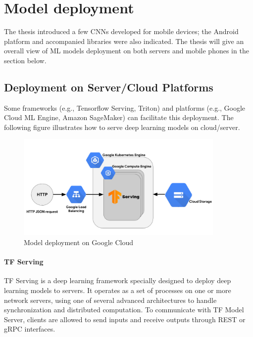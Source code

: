 
\section{Model deployment}
The thesis introduced a few CNNs developed for mobile devices; the Android platform and accompanied libraries were also indicated. The thesis will give an overall view of ML models deployment on both servers and mobile phones in the section below. 

\subsection{Deployment on Server/Cloud Platforms}
Some frameworks (e.g., Tensorflow Serving, Triton) and platforms (e.g., Google Cloud ML Engine, Amazon SageMaker) can facilitate this deployment. The following figure illustrates how to serve deep learning models on cloud/server.

\begin{figure} [H]
    \centering
    \includegraphics[width=0.9\textwidth]{chapter2/image/tfserving.png}
    \caption{Model deployment on Google Cloud}
    \label{fig:cloud}
\end{figure}

\paragraph{TF Serving}
TF Serving \cite{tfserving} is a deep learning framework specially designed to deploy deep learning models to servers. It operates as a set of processes on one or more network servers, using one of several advanced architectures to handle synchronization and distributed computation. To communicate with TF Model Server, clients are allowed to send inputs and receive outputs through REST or gRPC interfaces. \par 
